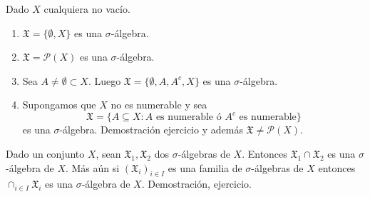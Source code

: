 \begin{eg}
    Dado $X$ cualquiera no vacío.
    \begin{enumerate}
        \item $\mathfrak{X} = \{ \emptyset, X \}$ es una $\sigma$-álgebra.
        \item $\mathfrak{X} = \mathcal{P}(X)$ es una $\sigma$-álgebra.
        \item Sea $A \neq \emptyset \subset X$. Luego $\mathfrak{X} = \{ \emptyset, A, A^c, X \}$ es una $\sigma$-álgebra.
        \item Supongamos que $X$ no es numerable y sea
              \begin{equation}
                  \mathfrak{X} = \{ A \subseteq X : A \text{ es numerable ó } A^c \text{ es numerable} \}
              \end{equation}
              es una $\sigma$-álgebra. Demostración ejercicio y además $\mathfrak{X} \neq \mathcal{P}(X)$.
    \end{enumerate}
\end{eg}

\begin{lemma}
    Dado un conjunto $X$, sean $\mathfrak{X}_1, \mathfrak{X}_2$ dos $\sigma$-álgebras de $X$. Entonces $\mathfrak{X}_1 \cap \mathfrak{X}_2$ es una $\sigma$-álgebra de $X$.
    Más aún si $(\mathfrak{X}_i)_{i \in I}$ es una familia de $\sigma$-álgebras de $X$ entonces $\cap_{i \in I} \mathfrak{X}_i$ es una $\sigma$-álgebra de $X$.
    Demostración, ejercicio.
\end{lemma}

